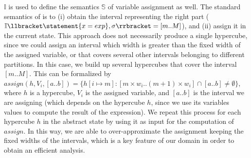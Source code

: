 $\mathbb{I}$ is used to define the semantics $\mathbb{S}$ of variable assignment as well. The standard semantics of  is to (i) obtain the interval representing the right part ($\mathbb{I}\llbracket\statement{x=exp}, \sigma\rrbracket=[m..M]$), and (ii) assign it in the current state. This approach does not necessarily produce a single hypercube, since we could assign an interval which width is greater than the fixed width of the assigned variable, or that covers several other intervals belonging to different partitions. In this case, we build up several hypercubes that cover the interval $[m..M]$. This can be formalized by $assign(h, V_i, [a..b])=\{h[i\mapsto m] : [m\times w_i .. (m+1)\times w_i]\cap [a..b] \neq \emptyset\}$, where $h$ is a hypercube, $V_i$ is the assigned variable, and $[a..b]$ is the interval we are assigning (which depends on the hypercube $h$, since we use its variables values to compute the result of the expression). We repeat this process for each hypercube $h$ in the abstract state by using it as input for the computation of $assign$.
In this way, we are able to over-approximate the assignment keeping the fixed widths of the intervals, which is a key feature of our domain in order to obtain an efficient analysis.

